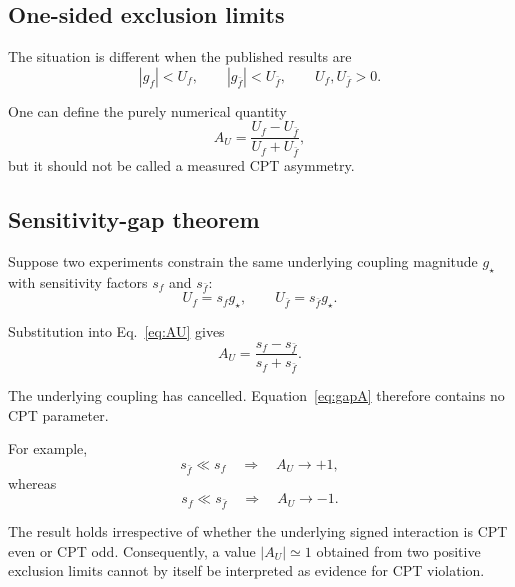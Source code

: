 \documentclass[aps,prd,reprint,superscriptaddress,nofootinbib]{revtex4-2}
\begin{document}
	\subsection{One-sided exclusion limits}
	
	The situation is different when the published results are
	\begin{equation}
		|g_f|<U_f,
		\qquad
		|g_{\bar f}|<U_{\bar f},
		\qquad
		U_f,U_{\bar f}>0 .
		\label{eq:limits}
	\end{equation}
	
	One can define the purely numerical quantity
	\begin{equation}
		A_U
		=
		\frac{U_f-U_{\bar f}}
		{U_f+U_{\bar f}},
		\label{eq:AU}
	\end{equation}
	but it should not be called a measured CPT asymmetry.
	
	\subsection{Sensitivity-gap theorem}
	
	Suppose two experiments constrain the same underlying coupling magnitude
	$g_\star$ with sensitivity factors $s_f$ and $s_{\bar f}$:
	\begin{equation}
		U_f=s_f g_\star,
		\qquad
		U_{\bar f}=s_{\bar f}g_\star .
		\label{eq:sensitivity}
	\end{equation}
	
	Substitution into Eq.~\eqref{eq:AU} gives
	\begin{equation}
		A_U
		=
		\frac{s_f-s_{\bar f}}
		{s_f+s_{\bar f}}.
		\label{eq:gapA}
	\end{equation}
	
	The underlying coupling has cancelled. Equation~\eqref{eq:gapA}
	therefore contains no CPT parameter.
	
	For example,
	\begin{equation}
		s_{\bar f}\ll s_f
		\quad\Longrightarrow\quad
		A_U\rightarrow +1,
	\end{equation}
	whereas
	\begin{equation}
		s_f\ll s_{\bar f}
		\quad\Longrightarrow\quad
		A_U\rightarrow -1.
	\end{equation}
	
	The result holds irrespective of whether the underlying signed
	interaction is CPT even or CPT odd. Consequently, a value
	$|A_U|\simeq1$ obtained from two positive exclusion limits cannot by
	itself be interpreted as evidence for CPT violation.
	
\end{document}
